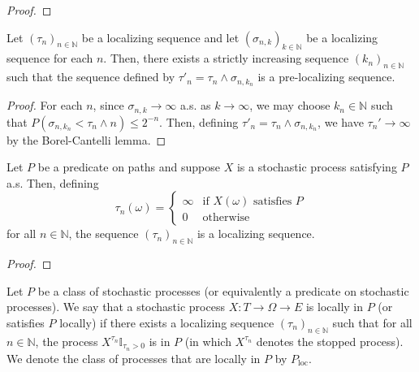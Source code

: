 \begin{proof}\leanok

\end{proof}


\begin{lemma}\label{lem:isPreLocalizingSequence_of_isLocalizingSequence}
  \leanok
Let $(\tau_n)_{n \in \mathbb{N}}$ be a localizing sequence and let $(\sigma_{n,k})_{k \in \mathbb{N}}$ be a localizing sequence for each $n$.
Then, there exists a strictly increasing sequence $(k_n)_{n \in \mathbb{N}}$ such that the sequence defined by $\tau'_n = \tau_n \wedge \sigma_{n,k_n}$ is a pre-localizing sequence.
\end{lemma}

\begin{proof}\leanok
  For each $n$, since $\sigma_{n,k} \to \infty$ a.s. as $k \to \infty$, we may choose $k_n \in \mathbb{N}$ such that $P(\sigma_{n,k_n} < \tau_n \wedge n) \le 2^{-n}$.
  Then, defining $\tau'_n = \tau_n \wedge \sigma_{n,k_n}$, we have $\tau_n' \to \infty$ by the Borel-Cantelli lemma.
\end{proof}


\begin{lemma}\label{lem:isLocalizingSequence_ae}
  Let $P$ be a predicate on paths and suppose $X$ is a stochastic process satisfying $P$ a.s. Then, defining
  $$\tau_n(\omega) =
  \begin{cases}
    \infty & \text{if } X(\omega) \text{ satisfies } P \\
    0 & \text{otherwise}
  \end{cases}
  $$
  for all $n \in \mathbb{N}$, the sequence $(\tau_n)_{n \in \mathbb{N}}$ is a localizing sequence.
\end{lemma}

\begin{proof}\end{proof}


\begin{definition}\label{def:locally}
  \mathlibok
Let $P$ be a class of stochastic processes (or equivalently a predicate on stochastic processes).
We say that a stochastic process $X : T \to \Omega \to E$ is locally in $P$ (or satisfies $P$ locally) if there exists a localizing sequence $(\tau_n)_{n \in \mathbb{N}}$ such that for all $n \in \mathbb{N}$, the process $X^{\tau_n}\mathbb{I}_{\tau_n > 0}$ is in $P$ (in which $X^{\tau_n}$ denotes the stopped process).
We denote the class of processes that are locally in $P$ by $P_{\mathrm{loc}}$.
\end{definition}


